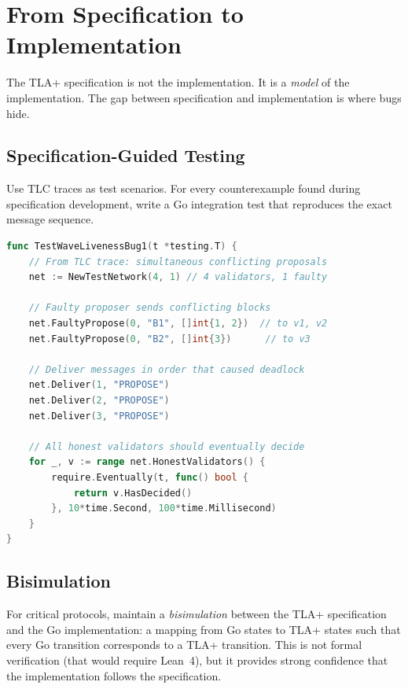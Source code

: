 \documentclass[11pt,a4paper]{article}
\begin{document}
\section{From Specification to Implementation}

The TLA+ specification is not the implementation. It is a \emph{model} of the
implementation. The gap between specification and implementation is where bugs hide.

\subsection{Specification-Guided Testing}

Use TLC traces as test scenarios. For every counterexample found during specification
development, write a Go integration test that reproduces the exact message sequence.

\begin{lstlisting}[language=Go,caption={Go test derived from TLC counterexample trace}]
func TestWaveLivenessBug1(t *testing.T) {
    // From TLC trace: simultaneous conflicting proposals
    net := NewTestNetwork(4, 1) // 4 validators, 1 faulty

    // Faulty proposer sends conflicting blocks
    net.FaultyPropose(0, "B1", []int{1, 2})  // to v1, v2
    net.FaultyPropose(0, "B2", []int{3})      // to v3

    // Deliver messages in order that caused deadlock
    net.Deliver(1, "PROPOSE")
    net.Deliver(2, "PROPOSE")
    net.Deliver(3, "PROPOSE")

    // All honest validators should eventually decide
    for _, v := range net.HonestValidators() {
        require.Eventually(t, func() bool {
            return v.HasDecided()
        }, 10*time.Second, 100*time.Millisecond)
    }
}
\end{lstlisting}

\subsection{Bisimulation}

For critical protocols, maintain a \emph{bisimulation} between the TLA+ specification
and the Go implementation: a mapping from Go states to TLA+ states such that every
Go transition corresponds to a TLA+ transition. This is not formal verification (that
would require Lean~4), but it provides strong confidence that the implementation follows
the specification.
\end{document}
